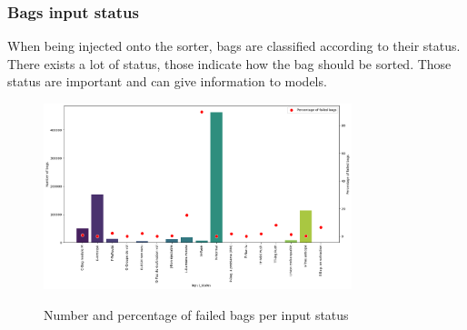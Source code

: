 \documentclass[12pt]{article}
\begin{document}
\subsubsection{Bags input status}
When being injected onto the sorter, bags are classified according to their status. There exists a lot of status, those indicate how the bag should be sorted. Those status are important and can give information to models.
\begin{figure}[h]
    \centering    \includegraphics[width=0.8\textwidth]{failed bags per input status.png}\\
    \caption{Number and percentage of failed bags per input status}
    \label{fig:Number and percentage of failed bags per input status}
\end{figure}
\FloatBarrier
\end{document}
